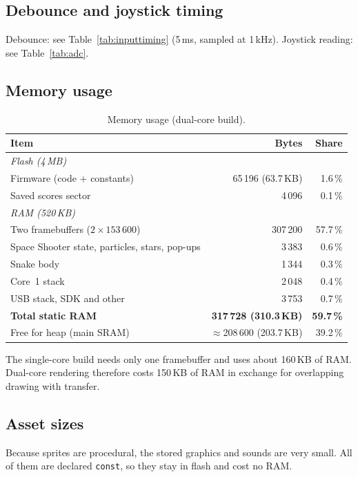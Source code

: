 \documentclass[11pt,a4paper]{article}
\begin{document}
\subsection{Debounce and joystick timing}
Debounce: see Table~\ref{tab:inputtiming} (5\,ms, sampled at 1\,kHz). Joystick
reading: see Table~\ref{tab:adc}.

\subsection{Memory usage}
\begin{table}[H]
\centering
\caption{Memory usage (dual-core build).}\label{tab:mem}
\begin{tabular}{lrr}
\toprule
\textbf{Item} & \textbf{Bytes} & \textbf{Share} \\
\midrule
\multicolumn{3}{l}{\textit{Flash (4\,MB)}} \\
Firmware (code + constants) & 65\,196 (63.7\,KB) & 1.6\,\% \\
Saved scores sector & 4\,096 & 0.1\,\% \\
\midrule
\multicolumn{3}{l}{\textit{RAM (520\,KB)}} \\
Two framebuffers ($2\times153\,600$) & 307\,200 & 57.7\,\% \\
Space Shooter state, particles, stars, pop-ups & 3\,383 & 0.6\,\% \\
Snake body & 1\,344 & 0.3\,\% \\
Core~1 stack & 2\,048 & 0.4\,\% \\
USB stack, SDK and other & 3\,753 & 0.7\,\% \\
\textbf{Total static RAM} & \textbf{317\,728 (310.3\,KB)} & \textbf{59.7\,\%} \\
Free for heap (main SRAM) & $\approx$208\,600 (203.7\,KB) & 39.2\,\% \\
\bottomrule
\end{tabular}
\end{table}

\noindent The single-core build needs only one framebuffer and uses about
160\,KB of RAM. Dual-core rendering therefore costs 150\,KB of RAM in exchange
for overlapping drawing with transfer.

\subsection{Asset sizes}
Because sprites are procedural, the stored graphics and sounds are very small.
All of them are declared \texttt{const}, so they stay in flash and cost no RAM.
\end{document}
